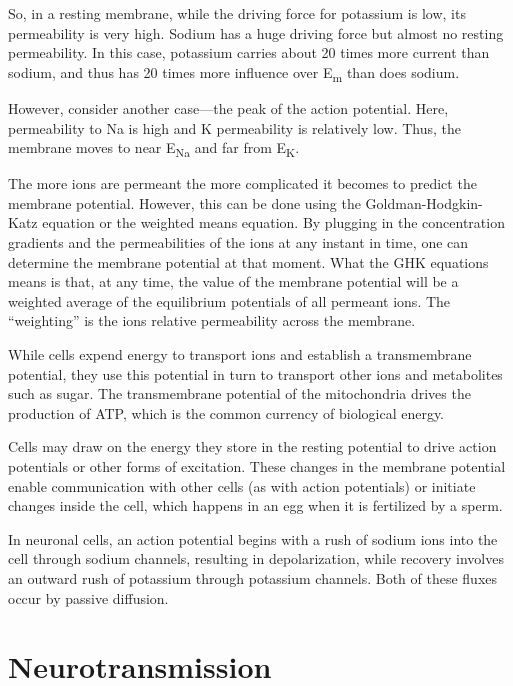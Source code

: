 \documentclass[]{book}
\begin{document}
So, in a resting membrane, while the driving force for potassium is low, its permeability is very high. Sodium has a huge driving force but almost no resting permeability. In this case, potassium carries about 20 times more current than sodium, and thus has 20 times more influence over E\textsubscript{m} than does sodium.

However, consider another case---the peak of the action potential. Here, permeability to Na is high and K permeability is relatively low. Thus, the membrane moves to near E\textsubscript{Na} and far from E\textsubscript{K}.

The more ions are permeant the more complicated it becomes to predict the membrane potential. However, this can be done using the Goldman-Hodgkin-Katz equation or the weighted means equation. By plugging in the concentration gradients and the permeabilities of the ions at any instant in time, one can determine the membrane potential at that moment. What the GHK equations means is that, at any time, the value of the membrane potential will be a weighted average of the equilibrium potentials of all permeant ions. The ``weighting'' is the ions relative permeability across the membrane.

While cells expend energy to transport ions and establish a transmembrane potential, they use this potential in turn to transport other ions and metabolites such as sugar. The transmembrane potential of the mitochondria drives the production of ATP, which is the common currency of biological energy.

Cells may draw on the energy they store in the resting potential to drive action potentials or other forms of excitation. These changes in the membrane potential enable communication with other cells (as with action potentials) or initiate changes inside the cell, which happens in an egg when it is fertilized by a sperm.

In neuronal cells, an action potential begins with a rush of sodium ions into the cell through sodium channels, resulting in depolarization, while recovery involves an outward rush of potassium through potassium channels. Both of these fluxes occur by passive diffusion.

\hypertarget{neurotransmission}{%
\chapter{Neurotransmission}\label{neurotransmission}}
\end{document}

